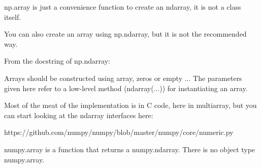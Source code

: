 \documentclass[11pt]{article} %
\begin{document}
 np.array is just a convenience function to create an ndarray, it is not a class itself. 

You can also create an array using np.ndarray, but it is not the recommended way. 

From the docstring of np.ndarray: 


Arrays should be constructed using array, zeros or empty ... 
The parameters given here refer to a low-level method (ndarray(...)) for instantiating an array.
 
Most of the meat of the implementation is in C code, here in multiarray, but you can start looking at the ndarray interfaces here:

https://github.com/numpy/numpy/blob/master/numpy/core/numeric.py
 


numpy.array is a function that returns a numpy.ndarray. There is no object type numpy.array.
 
\end{document}
